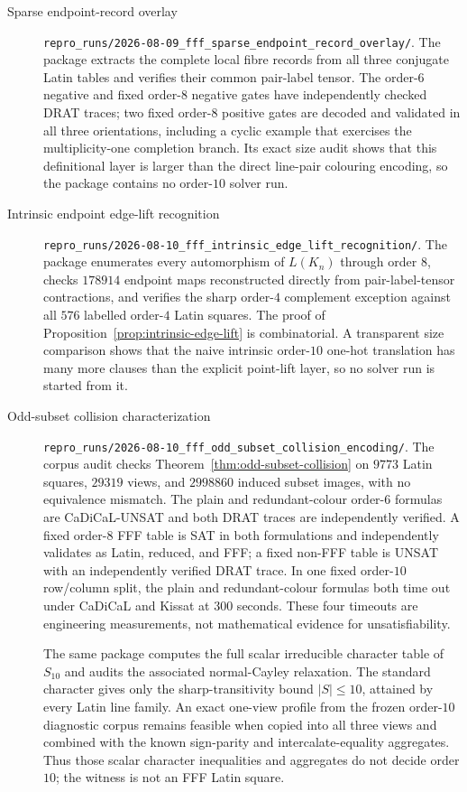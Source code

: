 \begin{description}
\item[Sparse endpoint-record overlay]
\nolinkurl{repro_runs/2026-08-09_fff_sparse_endpoint_record_overlay/}.
The package extracts the complete local fibre records from all three
conjugate Latin tables and verifies their common pair-label tensor.  The order-$6$
negative and fixed order-$8$ negative gates have independently checked DRAT
traces; two fixed order-$8$ positive gates are decoded and validated in all
three orientations, including a cyclic example that exercises the
multiplicity-one completion branch.  Its exact size audit shows that this
definitional layer is larger than the direct line-pair colouring encoding,
so the package contains no
order-$10$ solver run.

\item[Intrinsic endpoint edge-lift recognition]
\nolinkurl{repro_runs/2026-08-10_fff_intrinsic_edge_lift_recognition/}.
The package enumerates every automorphism of $L(K_n)$ through order $8$,
checks $178914$ endpoint maps reconstructed directly from pair-label-tensor
contractions,
and verifies the sharp order-$4$ complement exception against all $576$
labelled order-$4$ Latin squares.  The proof of
Proposition~\ref{prop:intrinsic-edge-lift} is combinatorial.  A transparent
size comparison shows that the naive intrinsic order-$10$ one-hot translation
has many more clauses than the explicit point-lift layer, so no solver run is
started from it.

\item[Odd-subset collision characterization]
\nolinkurl{repro_runs/2026-08-10_fff_odd_subset_collision_encoding/}.
The corpus audit checks Theorem~\ref{thm:odd-subset-collision} on $9773$
Latin squares, $29319$ views, and $2998860$ induced subset images, with no
equivalence mismatch.  The plain and redundant-colour order-$6$ formulas are
CaDiCaL-UNSAT and both DRAT traces are independently verified.  A fixed
order-$8$ FFF table is SAT in both formulations and independently validates
as Latin, reduced, and FFF; a fixed non-FFF table is UNSAT with an
independently verified DRAT trace.  In one fixed order-$10$ row/column split,
the plain and redundant-colour formulas both time out under CaDiCaL and
Kissat at $300$ seconds.  These four timeouts are engineering measurements,
not mathematical evidence for unsatisfiability.

The same package computes the full scalar irreducible character table of
$S_{10}$ and audits the associated normal-Cayley relaxation.  The standard
character gives only the sharp-transitivity bound $|S|\leq10$, attained by
every Latin line family.  An exact one-view profile from the frozen
order-$10$ diagnostic corpus remains feasible when copied into all three
views and combined with the known sign-parity and intercalate-equality
aggregates.  Thus those scalar character inequalities and aggregates do not
decide order $10$; the witness is not an FFF Latin square.


\end{description}
